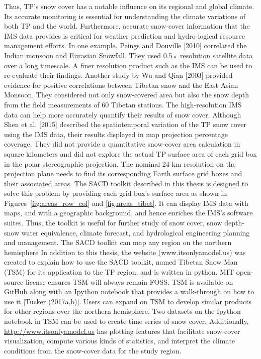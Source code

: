 Thus, TP’s snow cover has a notable influence on its regional and global climate. Its accurate monitoring is essential for understanding the climate variations of both TP and the world. Furthermore, accurate snow-cover information that the IMS data provides is critical for weather prediction and hydro-logical resource management efforts. In one example, Peings and Douville [2010] correlated the Indian monsoon and Eurasian Snowfall. They used 0.5◦ resolution satellite data over a long timescale. A finer resolution product such as the IMS can be used to re-evaluate their findings. Another study by Wu and Qian [2003] provided evidence for positive correlations between Tibetan snow and the East Asian Monsoon. They considered not only snow-covered area but also the snow depth from the field measurements of 60 Tibetan stations. The high-resolution IMS data can help more accurately quantify their results of snow cover. Although Shen et al. [2015] described the spatiotemporal variation of the TP snow cover using the IMS data, their results displayed in map projection percentage coverage. They did not provide a quantitative snow-cover area calculation in square kilometers and did not explore the actual TP surface area of each grid box in the polar stereographic projection. The nominal 24 km resolution on the projection plane needs to find its corresponding Earth surface grid boxes and their associated areas. The SACD toolkit described in this thesis is designed to solve this problem by providing each grid box’s surface area as shown in Figures~\ref{fig:areas_row_col} and \ref{fig:areas_tibet}. It can display IMS data with maps, and with a geographic background, and hence enriches the IMS’s software suites. Thus, the toolkit is useful for further study of snow cover, snow depth-snow water equivalence, climate forecast, and hydrological engineering planning and management. The SACD toolkit can map any region on the northern hemisphere
In addition to this thesis, the website \href{http://www.itsonlyamodel.us}({www.itsonlyamodel.us}) was created to explain how to use the SACD toolkit, named Tibetan Snow Man (TSM) for its application to the TP region, and is written in python. MIT open-source license ensures TSM will always remain FOSS. TSM is available on GitHub along with an Ipython notebook that provides a walk-through on how to use it [Tucker (2017a,b)]. Users can expand on TSM to develop similar products for other regions over the northern hemisphere. Two datasets on the Ipython notebook in TSM can be used to create time series of snow cover. Additionally, \url{http://www.itsonlyamodel.us} has plotting features that facilitate snow-cover visualization, compute various kinds of statistics, and interpret the climate conditions from the snow-cover data for the study region.

